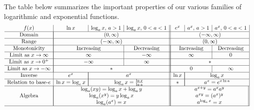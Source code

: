 \begin{namedtheorem} The table below summarizes the important properties of our various families of logarithmic and exponential functions.
\[
\begin{array}{c|c|c|c||c|c|c|}
  f(x) & \ln x& \log_a x,\, a>1& \log_a x,\, 0<a<1&  e^x & a^x,\, a>1 & a^x,\, 0<a<1 \\
  \hline
  \text{Domain} &\multicolumn{3}{|c||}{(0,\infty)}&\multicolumn{3}{c|}{(-\infty, \infty)}\\
  \hline
  \text{Range} &\multicolumn{3}{|c||}{(-\infty,\infty)}&\multicolumn{3}{c|}{(0, \infty)}\\
  \hline
  \text{Monotonicity}&\multicolumn{2}{|c|}{\text{Increasing}}&\text{Decreasing}&\multicolumn{2}{|c|}{\text{Increasing}}&\text{Decreasing}\\
  \hline
  \text{Limit as }x\to\infty& \multicolumn{2}{|c|}{\infty}&-\infty &  \multicolumn{2}{|c|}{\infty}& 0\\
  \hline
  \text{Limit as }x\to 0^+ & \multicolumn{2}{|c|}{-\infty}& \infty & \multicolumn{3}{|c|}{*}\\
  \hline
  \text{Limit as }x\to-\infty & \multicolumn{3}{|c||}{*}&  \multicolumn{2}{|c|}{0}& \infty\\
  \hline
  \text{Inverse}&e^x&\multicolumn{2}{|c||}{a^x}& \ln x& \multicolumn{2}{|c|}{\log_a x}\\
  \hline
  \text{Relation to base-$e$}&\ln x=\log_e x&\multicolumn{2}{|c||}{\log_a x=\frac{\ln x}{\ln a}} &* &\multicolumn{2}{|c|}{a^x=e^{x\ln a}}\\
  \hline
  \text{Algebra}&\multicolumn{3}{|c||}{\begin{array}{c}
    \log_a(xy)=\log_ax+\log_ay\\
    \log_a(x^y)=y\log_a x\\
    \log_a(a^x)=x
  \end{array}
  }
  &
  \multicolumn{3}{|c||}{\begin{array}{c}
    a^{x+y}=a^xa^y\\
    a^{xy}=(a^x)^y\\
    a^{\log_a x}=x
  \end{array}
  }\\
  \hline
\end{array}
\]


\end{namedtheorem}


